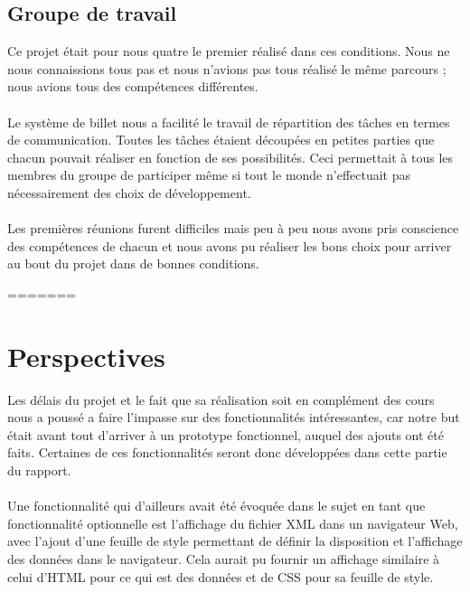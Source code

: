 \subsection{Groupe de travail}
Ce projet était pour nous quatre le premier réalisé dans ces conditions. Nous ne nous connaissions tous pas et nous n'avions pas tous réalisé le même parcours ; nous avions tous des compétences différentes.
\paragraph{}

Le système de billet nous a facilité le travail de répartition des tâches en termes de communication. Toutes les tâches étaient découpées en petites parties que chacun pouvait réaliser en fonction de ses possibilités. Ceci permettait à tous les membres du groupe de participer même si tout le monde n’effectuait pas nécessairement des choix de développement.
\paragraph{}

Les premières réunions furent difficiles mais peu à peu nous avons pris conscience des compétences de chacun et nous avons pu réaliser les bons choix pour arriver au bout du projet dans de bonnes conditions.




=======
	\section{Perspectives}
Les délais du projet et le fait que sa réalisation soit en complément des cours nous a poussé a faire l'impasse sur des fonctionnalités intéressantes, car notre but était avant tout d'arriver à un prototype fonctionnel, auquel des ajouts ont été faits. Certaines de ces fonctionnalités seront donc développées dans cette partie du rapport.
\paragraph{}

Une fonctionnalité qui d'ailleurs avait été évoquée dans le sujet en tant que fonctionnalité optionnelle est l'affichage du fichier XML dans un navigateur Web, avec l'ajout d'une feuille de style permettant de définir la disposition et l'affichage des données dans le navigateur. Cela aurait pu fournir un affichage similaire à celui d'HTML pour ce qui est des données et de CSS pour sa feuille de style.
